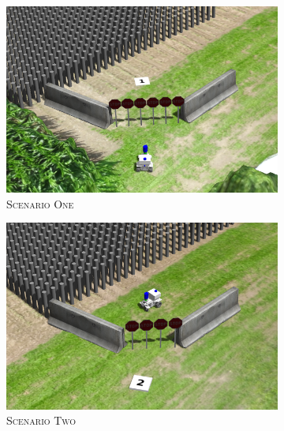 \documentclass[english, master, utf8]{base/thesis_KBS}
\begin{document}
\begin{figure}[H]
    \centering
    \begin{subfigure}[b]{0.24\textwidth}
        \centering
        \includegraphics[width=\textwidth]{pics/static_1.png}
        \caption{\textsc{Scenario One}}
        \label{fig:static_1}
    \end{subfigure}
    \hfill
    \begin{subfigure}[b]{0.24\textwidth}
        \centering
        \includegraphics[width=\textwidth]{pics/static_2.png}
        \caption{\textsc{Scenario Two}}
        \label{fig:static_2}
    \end{subfigure}
    \begin{subfigure}[b]{0.24\textwidth}
        \centering

\end{subfigure}
\end{figure}
\end{document}
